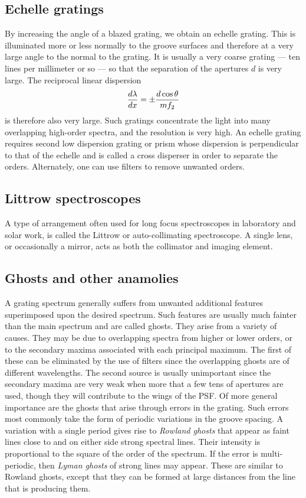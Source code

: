 \subsection{Echelle gratings}
By increasing the angle of a blazed grating, we obtain an echelle 
grating. This is illuminated more or less normally to the groove surfaces and therefore at
a very large angle to the normal to the grating. It is usually a very coarse grating ---
ten lines per millimeter or so --- so that the separation of the apertures $d$ is very large. The reciprocal linear dispersion
\[
{d\lambda\over dx}=\pm{d\cos\theta\over mf_2}
\]
is therefore also very large. Such gratings concentrate the light into many overlapping high-order spectra, and the resolution is very high. An echelle grating requires second
low dispersion grating or prism whose dispersion is perpendicular to that of the echelle
and is called a cross disperser in order to separate the orders. Alternately, one can use filters to remove unwanted orders.

\subsection{Littrow spectroscopes}
A type of arrangement often used for long focus spectroscopes in laboratory and solar work, is called the Littrow or auto-collimating spectroscope. A single lens, or occasionally a mirror, acts as both the collimator and imaging element.

\subsection{Ghosts and other anamolies}

A grating spectrum generally suffers from unwanted additional features superimposed upon the desired spectrum. Such features are usually much fainter than the main spectrum and are called ghosts. They arise from a variety of causes. They may be due
to overlapping spectra from higher or lower orders, or to the secondary maxima associated with each principal maximum. The first of these can be eliminated by the use
of filters since the overlapping ghosts are of different wavelengths. The second source
is usually unimportant since the secondary maxima are very weak when more that a few
tens of apertures are used, though they will contribute to the wings of the PSF. 
Of more general importance are the ghosts that arise through errors in the grating. 
Such errors most commonly take the form of periodic variations in the groove spacing.
A variation with a single period gives rise to {\it Rowland ghosts} that appear as faint
lines close to and on either side strong spectral lines. Their intensity is proportional to the square of the order of the spectrum. If the error is multi-periodic, then {\it Lyman ghosts} of strong lines may appear. These are similar to Rowland ghosts, except that they can be formed at large distances from the line that is producing them. 


